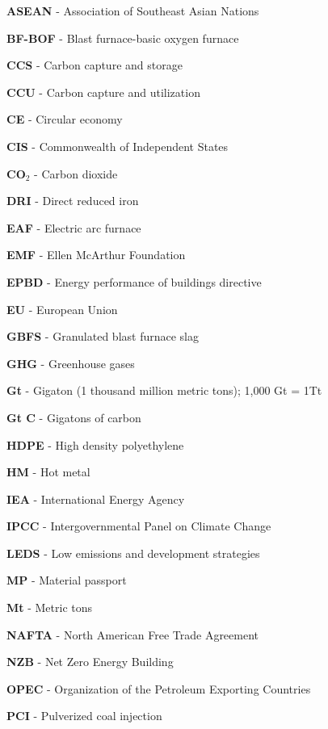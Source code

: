 \begin{scriptsize}
  \begin{myitemize}
  \item[] \textbf{ASEAN} - Association of Southeast Asian Nations
  \item[] \textbf{BF-BOF} - Blast furnace-basic oxygen furnace
  \item[] \textbf{CCS} - Carbon capture and storage
  \item[] \textbf{CCU} - Carbon capture and utilization
  \item[] \textbf{CE} - Circular economy
  \item[] \textbf{CIS} - Commonwealth of Independent States
  \item[] \textbf{CO$_2$} - Carbon dioxide
  \item[] \textbf{DRI} - Direct reduced iron
  \item[] \textbf{EAF} - Electric arc furnace
  \item[] \textbf{EMF} - Ellen McArthur Foundation
  \item[] \textbf{EPBD} - Energy performance of buildings directive
  \item[] \textbf{EU} - European Union
  \item[] \textbf{GBFS} - Granulated blast furnace slag
  \item[] \textbf{GHG} - Greenhouse gases
  \item[] \textbf{Gt} - Gigaton (1 thousand million metric tons); 1,000 Gt = 1Tt
  \item[] \textbf{Gt C} - Gigatons of carbon
  \item[] \textbf{HDPE} - High density polyethylene
  \item[] \textbf{HM} - Hot metal
  \item[] \textbf{IEA} - International Energy Agency
  \item[] \textbf{IPCC} - Intergovernmental Panel on Climate Change
  \item[] \textbf{LEDS} - Low emissions and development strategies
  \item[] \textbf{MP} - Material passport
  \item[] \textbf{Mt} - Metric tons
  \item[] \textbf{NAFTA} - North American Free Trade Agreement
  \item[] \textbf{NZB} - Net Zero Energy Building
  \item[] \textbf{OPEC} - Organization of the Petroleum Exporting Countries
  \item[] \textbf{PCI} - Pulverized coal injection

\end{myitemize}
\end{scriptsize}
